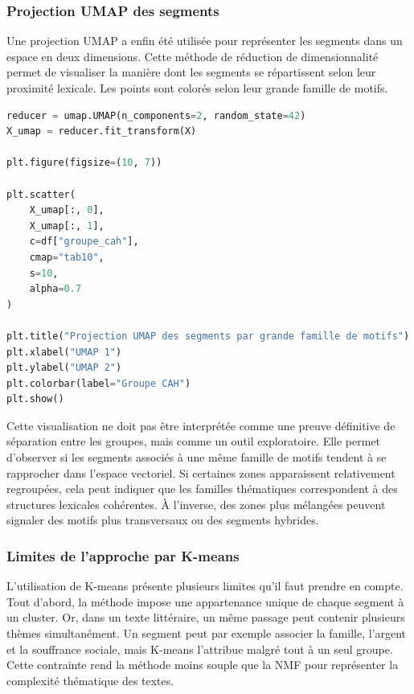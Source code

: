 \documentclass{article}
\begin{document}
\subsubsection{Projection UMAP des segments}

Une projection UMAP a enfin été utilisée pour représenter les segments dans un espace en deux dimensions. Cette méthode de réduction de dimensionnalité permet de visualiser la manière dont les segments se répartissent selon leur proximité lexicale. Les points sont colorés selon leur grande famille de motifs.

\begin{lstlisting}[language=Python, caption={Projection UMAP des segments par grande famille de motifs}]
reducer = umap.UMAP(n_components=2, random_state=42)
X_umap = reducer.fit_transform(X)

plt.figure(figsize=(10, 7))

plt.scatter(
    X_umap[:, 0],
    X_umap[:, 1],
    c=df["groupe_cah"],
    cmap="tab10",
    s=10,
    alpha=0.7
)

plt.title("Projection UMAP des segments par grande famille de motifs")
plt.xlabel("UMAP 1")
plt.ylabel("UMAP 2")
plt.colorbar(label="Groupe CAH")
plt.show()
\end{lstlisting}

Cette visualisation ne doit pas être interprétée comme une preuve définitive de séparation entre les groupes, mais comme un outil exploratoire. Elle permet d'observer si les segments associés à une même famille de motifs tendent à se rapprocher dans l'espace vectoriel. Si certaines zones apparaissent relativement regroupées, cela peut indiquer que les familles thématiques correspondent à des structures lexicales cohérentes. À l'inverse, des zones plus mélangées peuvent signaler des motifs plus transversaux ou des segments hybrides.

\subsubsection{Limites de l'approche par K-means}

L'utilisation de K-means présente plusieurs limites qu'il faut prendre en compte. Tout d'abord, la méthode impose une appartenance unique de chaque segment à un cluster. Or, dans un texte littéraire, un même passage peut contenir plusieurs thèmes simultanément. Un segment peut par exemple associer la famille, l'argent et la souffrance sociale, mais K-means l'attribue malgré tout à un seul groupe. Cette contrainte rend la méthode moins souple que la NMF pour représenter la complexité thématique des textes.
\end{document}
